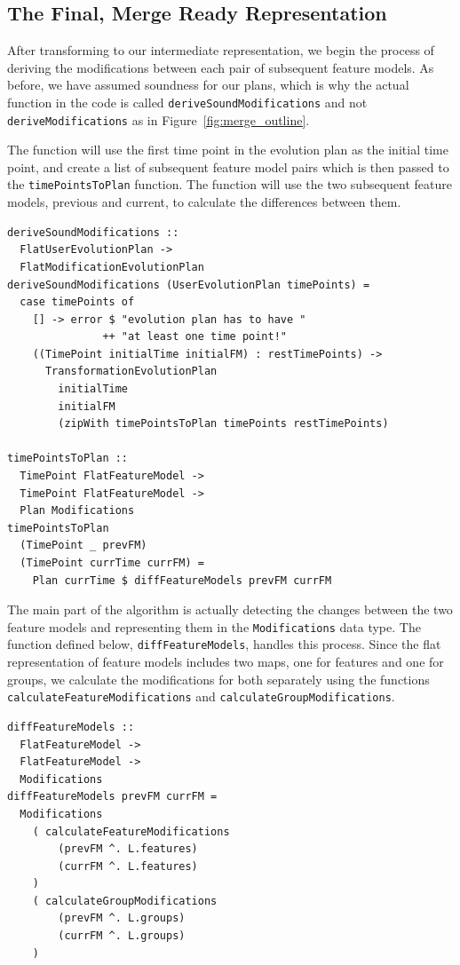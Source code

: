 \documentclass[a4paper,english]{ifimaster}
\begin{document}
\subsection{The Final, Merge Ready Representation}%
\label{sub:the_final_merge_ready_representation}

After transforming to our intermediate representation, we begin the process of deriving the modifications between each pair of subsequent feature models. As before, we have assumed soundness for our plans, which is why the actual function in the code is called \texttt{deriveSoundModifications} and not \texttt{deriveModifications} as in Figure~\ref{fig:merge_outline}.

The function will use the first time point in the evolution plan as the initial time point, and create a list of subsequent feature model pairs which is then passed to the \texttt{timePointsToPlan} function. The function will use the two subsequent feature models, previous and current, to calculate the differences between them.

\begin{verbatim}
deriveSoundModifications :: 
  FlatUserEvolutionPlan -> 
  FlatModificationEvolutionPlan
deriveSoundModifications (UserEvolutionPlan timePoints) = 
  case timePoints of
    [] -> error $ "evolution plan has to have " 
               ++ "at least one time point!"
    ((TimePoint initialTime initialFM) : restTimePoints) ->
      TransformationEvolutionPlan
        initialTime
        initialFM
        (zipWith timePointsToPlan timePoints restTimePoints)

timePointsToPlan ::
  TimePoint FlatFeatureModel -> 
  TimePoint FlatFeatureModel -> 
  Plan Modifications
timePointsToPlan 
  (TimePoint _ prevFM) 
  (TimePoint currTime currFM) =
    Plan currTime $ diffFeatureModels prevFM currFM
\end{verbatim}

The main part of the algorithm is actually detecting the changes between the two feature models and representing them in the \texttt{Modifications} data type. The function defined below, \texttt{diffFeatureModels}, handles this process. Since the flat representation of feature models includes two maps, one for features and one for groups, we calculate the modifications for both separately using the functions \texttt{calculateFeatureModifications} and \texttt{calculateGroupModifications}.

\begin{verbatim}
diffFeatureModels :: 
  FlatFeatureModel -> 
  FlatFeatureModel -> 
  Modifications
diffFeatureModels prevFM currFM =
  Modifications
    ( calculateFeatureModifications
        (prevFM ^. L.features)
        (currFM ^. L.features)
    )
    ( calculateGroupModifications
        (prevFM ^. L.groups)
        (currFM ^. L.groups)
    )
\end{verbatim}
\end{document}

